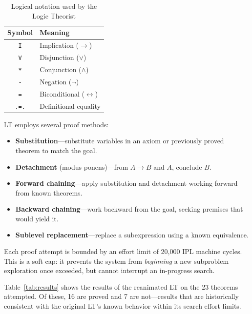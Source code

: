 \documentclass[journal]{IEEEtran}
\begin{document}
\begin{table}[h]
\centering
\caption{Logical notation used by the Logic Theorist}
\label{tab:notation}
\begin{tabular}{cl}
\toprule
\textbf{Symbol} & \textbf{Meaning} \\
\midrule
\texttt{I} & Implication ($\rightarrow$) \\
\texttt{V} & Disjunction ($\lor$) \\
\texttt{*} & Conjunction ($\land$) \\
\texttt{-} & Negation ($\lnot$) \\
\texttt{=} & Biconditional ($\leftrightarrow$) \\
\texttt{.=.} & Definitional equality \\
\bottomrule
\end{tabular}
\end{table}

LT employs several proof methods:

\begin{itemize}
\item \textbf{Substitution}---substitute variables in an axiom or
  previously proved theorem to match the goal.
\item \textbf{Detachment} (modus ponens)---from $A \rightarrow B$ and
  $A$, conclude $B$.
\item \textbf{Forward chaining}---apply substitution and detachment
  working forward from known theorems.
\item \textbf{Backward chaining}---work backward from the goal,
  seeking premises that would yield it.
\item \textbf{Sublevel replacement}---replace a subexpression using a
  known equivalence.
\end{itemize}

Each proof attempt is bounded by an effort limit of 20,000 IPL
machine cycles. This is a soft cap: it prevents the system from
\textit{beginning} a new subproblem exploration once exceeded, but
cannot interrupt an in-progress search.

Table~\ref{tab:results} shows the results of the reanimated LT on the
23 theorems attempted. Of these, 16 are proved and 7 are not---results
that are historically consistent with the original LT's known
behavior within its search effort limits.
\end{document}
